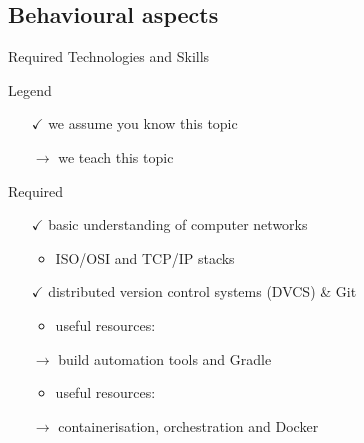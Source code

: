 \documentclass[presentation]{beamer}\mode<presentation>{\usetheme{AMSBolognaFC}}
\begin{document}
\subsection{Behavioural aspects}

\begin{frame}[c,allowframebreaks]{Required Technologies and Skills}

    \begin{block}{Legend}
        \begin{multicols}{2}
            \begin{itemize}
                \item[$\checkmark$] we assume you know this topic
                \item[$\rightarrow$] we teach this topic
            \end{itemize}
        \end{multicols}
    \end{block}

    \framebreak

    \begin{alertblock}{Required}
        \begin{itemize}
            \item[$\checkmark$] basic understanding of computer networks
            \begin{itemize}
                \item ISO/OSI and TCP/IP stacks
            \end{itemize}

            \item[$\checkmark$] distributed version control systems (DVCS) \& \alert{Git}
            \begin{itemize}
                \item useful resources: \cite{pianiniDvcs, proGit}
            \end{itemize}

            \vfill

            \item[$\rightarrow$] build automation tools and \alert{Gradle}
            \begin{itemize}
                \item useful resources: \cite{pianiniBuildAutomation, gradleUserGuide}
            \end{itemize}

            \vfill

            \item[$\rightarrow$] containerisation, orchestration and \alert{Docker}


\end{itemize}
\end{alertblock}
\end{frame}
\end{document}
